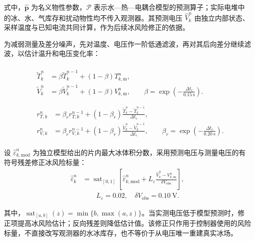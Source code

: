 \documentclass[bwprint]{gmcmthesis}
\numberwithin{equation}{section}
\numberwithin{figure}{section}
\begin{document}
式中，$\widehat{\boldsymbol p}$ 为名义物性参数，$\mathcal P$ 表示水—热—电耦合模型的预测算子；实际电堆中的冰、水、气库存和扰动物性均不传入观测器。其预测电压 $\widehat V_k^n$ 由独立内部状态、采样温度与已知电流共同计算，作为后续冰风险修正的依据。

为减弱测量及差分噪声，先对温度、电压作一阶低通滤波，再对其后向差分继续滤波，以估计温升和电压变化率：

\begin{align}
&
\begin{gathered}
\begin{aligned}
\widetilde T_k^n&=\beta\widetilde T_k^{n-1}+(1-\beta)T_{k,\mathrm m}^n,\\
\widetilde V_k^n&=\beta\widetilde V_k^{n-1}+(1-\beta)V_{k,\mathrm m}^n,
\qquad \beta=\exp\!\left(-\frac{\Delta t_c}{0.15\ \mathrm s}\right).
\end{aligned}
\end{gathered}
\label{eq:q4:signal_filter}\\
&
\begin{gathered}
\begin{aligned}
r_{T,k}^n&=\beta_r r_{T,k}^{n-1}+(1-\beta_r)
\frac{\widetilde T_k^n-\widetilde T_k^{n-1}}{\Delta t_c},\\
r_{V,k}^n&=\beta_r r_{V,k}^{n-1}+(1-\beta_r)
\frac{\widetilde V_k^n-\widetilde V_k^{n-1}}{\Delta t_c},\qquad
\beta_r=\exp\!\left(-\frac{\Delta t_c}{0.20\ \mathrm s}\right).
\end{aligned}
\end{gathered}
\label{eq:q4:rate_filter}
\end{align}

设 $\widehat\varepsilon_{k,\mathrm{mod}}^n$ 为独立模型给出的片内最大冰体积分数，采用预测电压与测量电压的有符号残差修正冰风险标量：
\begin{equation}
\begin{aligned}
\widehat\varepsilon_k^n
&=\operatorname{sat}_{[0,1]}\!\left[
\widehat\varepsilon_{k,\mathrm{mod}}^n
+L_\varepsilon\frac{\widehat V_k^n-V_{k,\mathrm m}^n}{\delta V_{\mathrm{obs}}}\right],
\\
&\qquad L_\varepsilon=0.02,\quad\delta V_{\mathrm{obs}}=0.10\ \mathrm V.
\end{aligned}
\label{eq:q4:ice_estimator}
\end{equation}

其中，$\operatorname{sat}_{[a,b]}(z)=\min\{b,\max(a,z)\}$。当实测电压低于模型预测时，修正项提高冰风险估计；反向残差则降低估计值。该修正只作用于控制器使用的风险标量，不直接改写观测器的水冰库存，也不等价于从电压唯一重建真实冰场。
\end{document}
